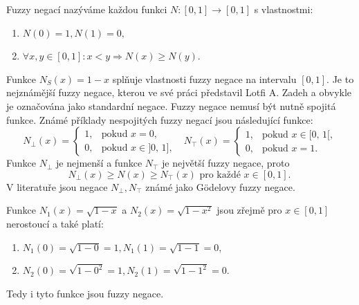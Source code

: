 \begin{definition}
\cite{Kolo} Fuzzy negací nazýváme každou funkci $N:[0, 1] \to [0, 1]$  s vlastnostmi:
    \begin{enumerate}
        \item  $N(0) = 1, N(1) = 0,$
        \item $\forall  x, y \in [0, 1]: x < y \Rightarrow{} N(x) \geq N(y).$
     \end{enumerate}
\end{definition}
     \begin{example}
         Funkce $N_S(x)=1-x$ spl\v nuje vlastnosti fuzzy negace na intervalu $[0,1].$ Je to nejzn\'am\v ej\v s\'i fuzzy negace, kterou ve sv\'e pr\'aci p\v redstavil Lotfi A. Zadeh a obvykle je ozna\v cov\'ana jako standardn\'i negace.   Fuzzy negace nemus\'i b\'yt nutn\v e spojit\'a funkce. Zn\'am\'e p\v r\'iklady nespojit\'ych fuzzy negac\'i jsou n\'asleduj\'ic\'i funkce:
         $$ N_{\bot}(x)=\begin{cases} 1, & \mbox{pokud }x=0, \\
         0, & \mbox{pokud }x\in \mbox{]0, 1]}, \end{cases} \mbox{  }
         N_{\top}(x)=\begin{cases} 1, & \mbox{pokud }x\in \mbox{[0, 1[}, \\
         0, & \mbox{pokud }x=1. \end{cases}$$
         Funkce $N_{\bot}$ je nejmen\v s\'i a funkce $N_{\top}$ je nejv\v et\v s\'i fuzzy negace, proto
         \begin{equation}
        N_{\bot}(x) \geq N(x) \geq N_\top(x)  \mbox{ pro každé } x \in [0, 1]. \
    \end{equation}
    V literatu\v re jsou negace $N_\bot, N_\top$ zn\'am\'e jako Gödelovy fuzzy negace.
    
    Funkce $N_1(x) = \sqrt{1-x}$ a $N_2(x) = \sqrt{1-x^2}$ jsou zřejmě pro $ x \in [0,1]$ nerostoucí a tak\'e plat\'i:
        \begin{enumerate}
            \item $N_1(0) = \sqrt{1-0} = 1, 
                    N_1(1) = \sqrt{1-1} = 0, $
            \item $N_2(0) = \sqrt{1-0^2} = 1,
                    N_2(1) = \sqrt{1-1^2} = 0.$
        \end{enumerate}
         Tedy i tyto funkce jsou fuzzy negace.


\end{example}
